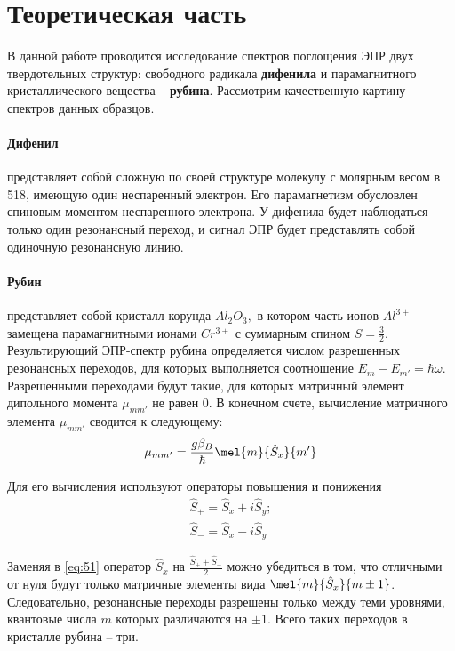 

\def\labauthors{Виноградов И.Д., Понур К.А., Шиков А.П.}
\def\labgroup{440}
\def\labnumber{1}
\def\labtheme{Исследование твердотельных структур методом ЭПР-спектроскопии}
\def\department{Кафедра квантовой радиофизики и электроники}

\newpage
\section{Теоретическая часть}%
В данной работе проводится исследование спектров поглощения ЭПР двух твердотельных структур: свободного радикала \textbf{дифенила} и парамагнитного кристаллического вещества --
\textbf{рубина}. Рассмотрим качественную картину спектров данных образцов.
\paragraph{Дифенил} представляет собой сложную по своей структуре молекулу с молярным весом в 518, имеющую один неспаренный электрон. Его парамагнетизм обусловлен спиновым моментом неспаренного электрона. У дифенила будет наблюдаться только один резонансный переход, и сигнал ЭПР будет представлять собой одиночную резонансную линию.
\paragraph{Рубин}%
представляет собой кристалл корунда $Al_2 O_3,$ в котором часть ионов  $Al^{3+}$ замещена парамагнитными ионами  $Cr^{3+}$ с суммарным спином  $S = \frac{3}{2}$. 
Результирующий ЭПР-спектр рубина определяется числом разрешенных резонансных переходов, для которых выполняется соотношение $E_m-E_{m'} = \hbar \omega$. 
Разрешенными переходами будут такие, для которых матричный элемент  дипольного момента $\mu_{mm'}$ не равен 0.
В конечном счете, вычисление матричного элемента $\mu_{mm'}$ сводится к следующему:
\begin{equation}
    \label{eq:51}
    \mu_{mm'} = \frac{g \beta_B}{\hbar} \mel{m}{\hat S_x}{m'} 
\end{equation}

Для его вычисления используют операторы повышения и понижения
\begin{gather}
    \hat S_+ = \hat S_x + i \hat S_y; \\
    \hat S_- = \hat S_x -  i \hat S_y
\end{gather}

Заменяя в \eqref{eq:51} оператор $\hat S_x$ на  $\frac{\hat S_+ + \hat S_-}{2} $ можно убедиться в том, что отличными от нуля будут только матричные элементы вида
$\mel{m}{\hat S_x}{m \pm 1}$. Следовательно, резонансные переходы разрешены только между теми уровнями, квантовые числа  $m$ которых различаются на  $\pm 1$. Всего таких переходов в 
кристалле рубина -- три.


